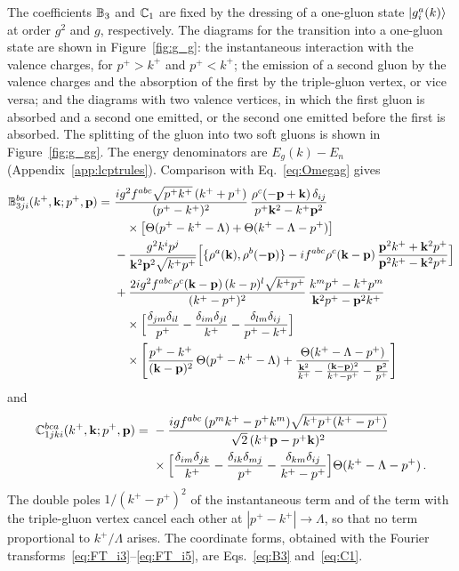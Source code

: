The coefficients $\mathbb{B}_3$ and $\mathbb{C}_1$ are fixed by the dressing of a one-gluon state $\ket{g^a_i(k)}$ at order $g^2$ and $g$, respectively. The diagrams for the transition into a one-gluon state are shown in Figure~\ref{fig:g_g}: the instantaneous interaction with the valence charges, for $p^+>k^+$ and $p^+<k^+$; the emission of a second gluon by the valence charges and the absorption of the first by the triple-gluon vertex, or vice versa; and the diagrams with two valence vertices, in which the first gluon is absorbed and a second one emitted, or the second one emitted before the first is absorbed. The splitting of the gluon into two soft gluons is shown in Figure~\ref{fig:g_gg}. The energy denominators are $E_g(k)-E_n$ (Appendix~\ref{app:lcptrules}). Comparison with Eq.~\eqref{eq:Omegag} gives
\begin{align}\label{eq:B3mom}
\mf B^{ba}_{3ji}(k^+,\v k;p^+,\v p)=\ &\frac{ig^2f^{abc}\sqrt{p^+k^+}\,(k^++p^+)}{(p^+-k^+)^2}\,\frac{\rho^c(-\v p+\v k)\,\delta_{ij}}{p^+\v k^2-k^+\v p^2}\notag\\&\quad\times\big[\Theta(p^+-k^+-\Lambda)+\Theta(k^+-\Lambda-p^+)\big]
\notag\\&
-\frac{g^2k^ip^j}{\v k^2\v p^2\sqrt{k^+p^+}}\Big[\{\rho^a(\v k),\rho^b(-\v p)\}-if^{abc}\rho^c(\v k-\v p)\,\frac{\v p^2k^++\v k^2p^+}{\v p^2k^+-\v k^2p^+}\Big]
\notag\\&
+\frac{2ig^2f^{abc}\rho^c(\v k-\v p)\,(k-p)^l\sqrt{k^+p^+}}{(k^+-p^+)^2}\,\frac{k^mp^+-k^+p^m}{\v k^2p^+-\v p^2k^+}\notag\\&\quad\times\Big[\frac{\delta_{jm}\delta_{il}}{p^+}-\frac{\delta_{im}\delta_{jl}}{k^+}-\frac{\delta_{lm}\delta_{ij}}{p^+-k^+}\Big]
\notag\\&\quad\times
\Bigg[\frac{p^+-k^+}{(\v k-\v p)^2}\,\Theta(p^+-k^+-\Lambda)+\frac{\Theta(k^+-\Lambda-p^+)}{\frac{\v k^2}{k^+}-\frac{(\v k-\v p)^2}{k^+-p^+}-\frac{\v p^2}{p^+}}\Bigg]
\end{align} 
and
\begin{align}\label{eq:C1mom}
\mf C^{bca}_{1jki}(k^+,\v k;p^+,\v p)=\ &-\frac{igf^{abc}\,(p^mk^+-p^+k^m)\sqrt{k^+p^+(k^+-p^+)}}{\sqrt2\,(k^+\v p-p^+\v k)^2}\notag\\&\times\Big[\frac{\delta_{im}\delta_{jk}}{k^+}-\frac{\delta_{ik}\delta_{mj}}{p^+}-\frac{\delta_{km}\delta_{ij}}{k^+-p^+}\Big]\Theta(k^+-\Lambda-p^+)\,.
\end{align}
The double poles $1/(k^+-p^+)^2$ of the instantaneous term and of the term with the triple-gluon vertex cancel each other at $|p^+-k^+|\to\Lambda$, so that no term proportional to $k^+/\Lambda$ arises. The coordinate forms, obtained with the Fourier transforms~\eqref{eq:FT_i3}--\eqref{eq:FT_i5}, are Eqs.~\eqref{eq:B3} and~\eqref{eq:C1}.

